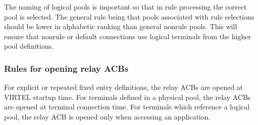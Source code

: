 \documentclass[letterpaper,10pt,english]{sphinxmanual}
\begin{document}
\begin{sphinxVerbatim}[commandchars=\\\{\}]
                           
                                
                                       
                                       
\end{sphinxVerbatim}

\sphinxAtStartPar
The naming of logical pools is important so that in rule processing the correct pool is selected. The general rule being that pools associated with rule selections should be lower in alphabetic ranking than general non\sphinxhyphen{}rule pools. This will ensure that non\sphinxhyphen{}rule or default connections use logical terminals from the higher pool definitions.


\subsubsection{Rules for opening relay ACBs}
\label{\detokenize{connectivity_guide:rules-for-opening-relay-acbs}}
\sphinxAtStartPar
For explicit or repeated fixed entry definitions, the relay ACBs are opened at VIRTEL startup time. For terminals defined in a physical pool, the relay ACBs are opened at terminal connection time. For terminals which reference a logical pool, the relay ACB is opened only when accessing an application.
\end{document}
